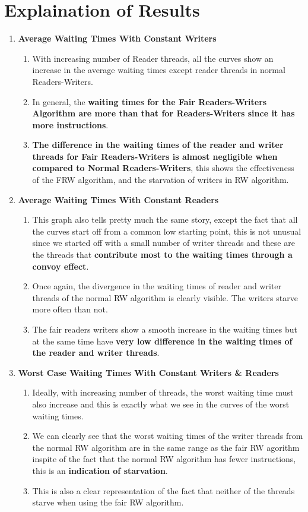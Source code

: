 \documentclass[a4paper,12pt]{report}
\begin{document}
\section{Explaination of Results}
\begin{enumerate}
\item \textbf{Average Waiting Times With Constant Writers}\\
\begin{enumerate}
\item With increasing number of Reader threads, all the curves show an increase in the average waiting times except reader threads in normal Readers-Writers.
\item In general, the \textbf{waiting times for the Fair Readers-Writers Algorithm are more than that for Readers-Writers since it has more instructions}.
\item \textbf{The difference in the waiting times of the reader and writer threads for Fair Readers-Writers is almost negligible when compared to Normal Readers-Writers}, this shows the effectiveness of the FRW algorithm, and the starvation of writers in RW algorithm.
\end{enumerate}
\item \textbf{Average Waiting Times With Constant Readers}\\
\begin{enumerate}
\item This graph also tells pretty much the same story, except the fact that all the curves start off from a common low starting point, this is not unusual since we started off with a small number of writer threads and these are the threads that \textbf{contribute most to the waiting times through a convoy effect}.
\item Once again, the divergence in the waiting times of reader and writer threads of the normal RW algorithm is clearly visible. The writers starve more often than not.
\item The fair readers writers show a smooth increase in the waiting times but at the same time have \textbf{very low difference in the waiting times of the reader and writer threads}.
\end{enumerate}
\item \textbf{Worst Case Waiting Times With Constant Writers \& Readers}\\
\begin{enumerate}
\item Ideally, with increasing number of threads, the worst waiting time must also increase and this is exactly what we see in the curves of the worst waiting times.
\item We can clearly see that the worst waiting times of the writer threads from the normal RW algorithm are in the same range as the fair RW agorithm inspite of the fact that the normal RW algorithm has fewer instructions, this is an \textbf{indication of starvation}.
\item This is also a clear representation of the fact that neither of the threads starve when using the fair RW algorithm.
\end{enumerate}
\end{enumerate}
\end{document}
